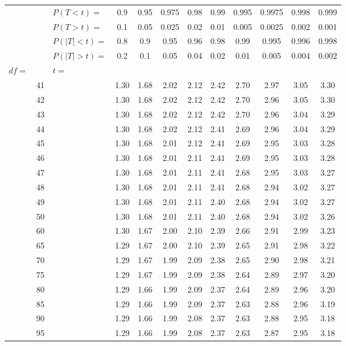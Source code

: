 \documentclass[12pt,letterpaper]{article}
\begin{document}
\begin{center}
\begin{tabular}{|l r | l c c c c c c c c c|}\hline
&& $P(T<t)=$ & 0.9 & 0.95 & 0.975 & 0.98 & 0.99 & 0.995 & 0.9975 & 0.998 & 0.999\\
&& $P(T>t)=$ & 0.1 & 0.05 & 0.025 & 0.02 & 0.01 & 0.005 & 0.0025 & 0.002 & 0.001\\
&& $P(|T|<t)=$ & 0.8 & 0.9 & 0.95 & 0.96 & 0.98 & 0.99 & 0.995 & 0.996 & 0.998\\
&& $P(|T|>t)=$ & 0.2 & 0.1 & 0.05 & 0.04 & 0.02 & 0.01 & 0.005 & 0.004 & 0.002\\\hline
$df=$ && $t=$ & & & & & & & & &\\ 
&41&& 1.30 & 1.68 & 2.02 & 2.12 & 2.42 & 2.70 & 2.97 & 3.05 & 3.30\\ 
&42&& 1.30 & 1.68 & 2.02 & 2.12 & 2.42 & 2.70 & 2.96 & 3.05 & 3.30\\ 
&43&& 1.30 & 1.68 & 2.02 & 2.12 & 2.42 & 2.70 & 2.96 & 3.04 & 3.29\\ 
&44&& 1.30 & 1.68 & 2.02 & 2.12 & 2.41 & 2.69 & 2.96 & 3.04 & 3.29\\ 
&45&& 1.30 & 1.68 & 2.01 & 2.12 & 2.41 & 2.69 & 2.95 & 3.03 & 3.28\\ 
&46&& 1.30 & 1.68 & 2.01 & 2.11 & 2.41 & 2.69 & 2.95 & 3.03 & 3.28\\ 
&47&& 1.30 & 1.68 & 2.01 & 2.11 & 2.41 & 2.68 & 2.95 & 3.03 & 3.27\\ 
&48&& 1.30 & 1.68 & 2.01 & 2.11 & 2.41 & 2.68 & 2.94 & 3.02 & 3.27\\ 
&49&& 1.30 & 1.68 & 2.01 & 2.11 & 2.40 & 2.68 & 2.94 & 3.02 & 3.27\\ 
&50&& 1.30 & 1.68 & 2.01 & 2.11 & 2.40 & 2.68 & 2.94 & 3.02 & 3.26\\ 
&60&& 1.30 & 1.67 & 2.00 & 2.10 & 2.39 & 2.66 & 2.91 & 2.99 & 3.23\\ 
&65&& 1.29 & 1.67 & 2.00 & 2.10 & 2.39 & 2.65 & 2.91 & 2.98 & 3.22\\ 
&70&& 1.29 & 1.67 & 1.99 & 2.09 & 2.38 & 2.65 & 2.90 & 2.98 & 3.21\\ 
&75&& 1.29 & 1.67 & 1.99 & 2.09 & 2.38 & 2.64 & 2.89 & 2.97 & 3.20\\ 
&80&& 1.29 & 1.66 & 1.99 & 2.09 & 2.37 & 2.64 & 2.89 & 2.96 & 3.20\\ 
&85&& 1.29 & 1.66 & 1.99 & 2.09 & 2.37 & 2.63 & 2.88 & 2.96 & 3.19\\ 
&90&& 1.29 & 1.66 & 1.99 & 2.08 & 2.37 & 2.63 & 2.88 & 2.95 & 3.18\\ 
&95&& 1.29 & 1.66 & 1.99 & 2.08 & 2.37 & 2.63 & 2.87 & 2.95 & 3.18\\ 

\end{tabular}
\end{center}
\end{document}
